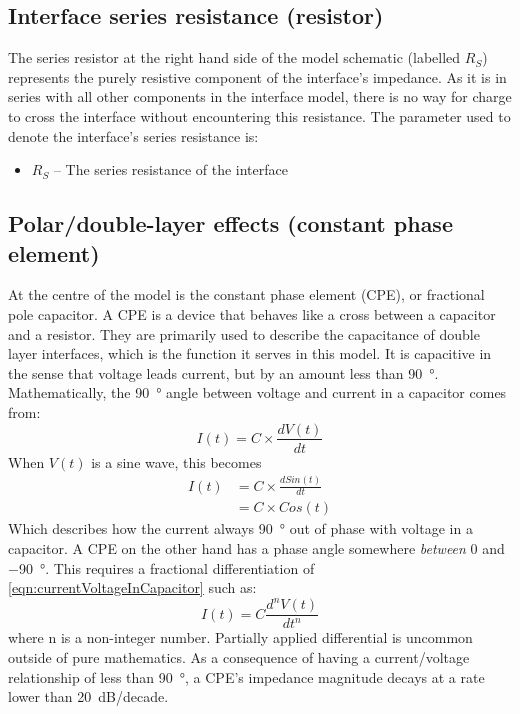   \subsection{Interface series resistance (resistor)}


    The series resistor at the right hand side of the model schematic (labelled $R_{S}$) represents the purely resistive component of the interface's impedance.
    As it is in series with all other components in the interface model, there is no way for charge to cross the interface without encountering this resistance.
    The parameter used to denote the interface's series resistance is:
    \begin{itemize}
      \item $R_S$ -- The series resistance of the interface
    \end{itemize}

  \subsection{Polar/double-layer effects (constant phase element)}

    At the centre of the model is the constant phase element (CPE), or fractional pole capacitor.
    A CPE is a device that behaves like a cross between a capacitor and a resistor.
    They are primarily used to describe the capacitance of double layer interfaces, which is the function it serves in this model.
    It is capacitive in the sense that voltage leads current, but by an amount less than \SI{90}{\degree}.
    Mathematically, the \SI{90}{\degree} angle between voltage and current in a capacitor comes from:
    \begin{equation}
    I(t) = C \times \frac{dV(t)}{dt}
    \label{eqn:currentVoltageInCapacitor}
    \end{equation}
    When $V(t)$ is a sine wave, this becomes
    \begin{align}
      I(t) &= C \times \frac{d Sin(t)}{dt}\\
           &= C \times Cos(t)
    \end{align}
    Which describes how the current always \SI{90}{\degree} out of phase with voltage in a capacitor.
    A CPE on the other hand has a phase angle somewhere \emph{between} 0 and \SI{-90}{\degree}.
    This requires a fractional differentiation of \cref{eqn:currentVoltageInCapacitor} such as:
    \begin{equation}
      I(t) = C \frac{d^n V(t)}{dt^n}
    \end{equation}
    where n is a non-integer number.
    Partially applied differential is uncommon outside of pure mathematics.
    As a consequence of having a current/voltage relationship of less than \SI{90}{\degree}, a CPE's impedance magnitude decays at a rate lower than 20\ dB/decade.

